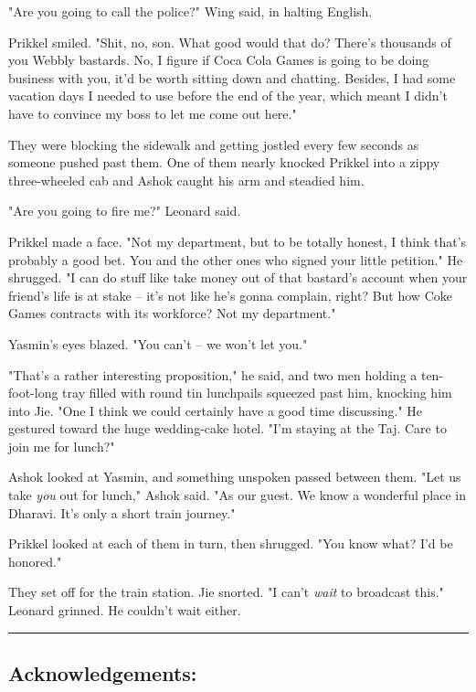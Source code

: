 "Are you going to call the police?" Wing said, in halting English.

Prikkel smiled. "Shit, no, son. What good would that do? There's
thousands of you Webbly bastards. No, I figure if Coca Cola Games
is going to be doing business with you, it'd be worth sitting down
and chatting. Besides, I had some vacation days I needed to use
before the end of the year, which meant I didn't have to convince
my boss to let me come out here."

They were blocking the sidewalk and getting jostled every few
seconds as someone pushed past them. One of them nearly knocked
Prikkel into a zippy three-wheeled cab and Ashok caught his arm and
steadied him.

"Are you going to fire me?" Leonard said.

Prikkel made a face. "Not my department, but to be totally honest,
I think that's probably a good bet. You and the other ones who
signed your little petition." He shrugged. "I can do stuff like
take money out of that bastard's account when your friend's life is
at stake -- it's not like he's gonna complain, right? But how Coke
Games contracts with its workforce? Not my department."

Yasmin's eyes blazed. "You can't -- we won't let you."

"That's a rather interesting proposition," he said, and two men
holding a ten-foot-long tray filled with round tin lunchpails
squeezed past him, knocking him into Jie. "One I think we could
certainly have a good time discussing." He gestured toward the huge
wedding-cake hotel. "I'm staying at the Taj. Care to join me for
lunch?"

Ashok looked at Yasmin, and something unspoken passed between them.
"Let us take \emph{you} out for lunch," Ashok said. "As our guest.
We know a wonderful place in Dharavi. It's only a short train
journey."

Prikkel looked at each of them in turn, then shrugged. "You know
what? I'd be honored."

They set off for the train station. Jie snorted. "I can't
\emph{wait} to broadcast this." Leonard grinned. He couldn't wait
either.

\begin{center}\rule{3in}{0.4pt}\end{center}

\subsection{Acknowledgements:}

